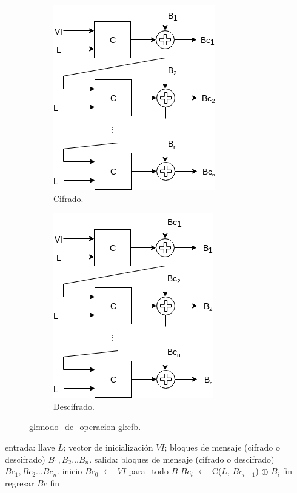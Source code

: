 \begin{figure}[H]
  \centering
  \begin{subfigure}{0.45\textwidth}
    \begin{center}
      \includegraphics[width=0.6\linewidth]
        {contenidos/antecedentes/bloques/modos/diagramas/modo_cfb.png}
      \caption{Cifrado.}
    \end{center}
  \end{subfigure}
  \begin{subfigure}{0.45\textwidth}
    \begin{center}
      \includegraphics[width=0.6\linewidth]
        {contenidos/antecedentes/bloques/modos/diagramas/modo_cfb_inverso.png}
      \caption{Descifrado.}
    \end{center}
  \end{subfigure}
  \caption{\Gls{gl:modo_de_operacion} \acrshort{gl:cfb}.}
  \label{fig:cfb}
\end{figure}

\begin{pseudocodigo}[%
    caption={\Gls{gl:modo_de_operacion} \acrshort{gl:cfb}%
      (cifrado y descifrado).}, 
    label={cfb:1}%
  ]
  entrada: llave $ L $; vector de inicialización $ VI $;
           bloques de mensaje (cifrado o descifrado) $ B_1, B_2 \dots B_n $.
  salida:  bloques de mensaje (cifrado o descifrado) $ Bc_1, Bc_2 \dots Bc_n $.
  inicio
    $Bc_0$ $\gets$ $ VI $
    para_todo $B$
      $Bc_i$ $\gets$ C($L$, $Bc_{i - 1}$) $\oplus$ $B_i$
    fin
    regresar $Bc$
  fin
\end{pseudocodigo}
